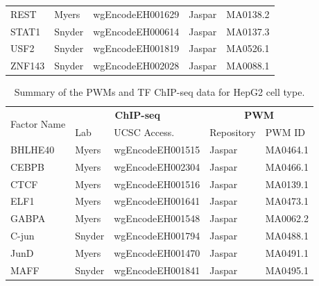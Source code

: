 \documentclass{bioinfo}
\begin{document}
\begin{table}[t]
\begin{center}
\begin{tabular}{ l|ll|ll }
        REST   & Myers     & wgEncodeEH001629 & Jaspar     & MA0138.2 \\
        STAT1  & Snyder    & wgEncodeEH000614 & Jaspar     & MA0137.3 \\
        USF2   & Snyder    & wgEncodeEH001819 & Jaspar     & MA0526.1 \\
        ZNF143 & Snyder    & wgEncodeEH002028 & Jaspar     & MA0088.1 \\
        \hline
    \end{tabular}
\end{center}
\end{table}

\begin{table}[t]
\begin{center}
\caption{Summary of the PWMs and TF ChIP-seq data for HepG2 cell type.}
\label{tab:datapwm.hepg2}
    \renewcommand{\arraystretch}{1.2}
    \begin{tabular}{ l|ll|ll }
        \hline
        \multirow{2}{*}{Factor Name} & \multicolumn{2}{c|}{\textbf{ChIP-seq}} & \multicolumn{2}{c}{\textbf{PWM}} \\
               & Lab    & UCSC Access.     & Repository & PWM ID \\
        \hline
        BHLHE40 & Myers  & wgEncodeEH001515 & Jaspar     & MA0464.1 \\
        CEBPB   & Myers  & wgEncodeEH002304 & Jaspar     & MA0466.1 \\
        CTCF    & Myers  & wgEncodeEH001516 & Jaspar     & MA0139.1 \\
        ELF1    & Myers  & wgEncodeEH001641 & Jaspar     & MA0473.1 \\
        GABPA    & Myers  & wgEncodeEH001548 & Jaspar     & MA0062.2 \\
        C-jun     & Snyder & wgEncodeEH001794 & Jaspar     & MA0488.1 \\
        JunD    & Myers  & wgEncodeEH001470 & Jaspar     & MA0491.1 \\
        MAFF    & Snyder & wgEncodeEH001841 & Jaspar     & MA0495.1 \\

\end{tabular}
\end{center}
\end{table}
\end{document}
